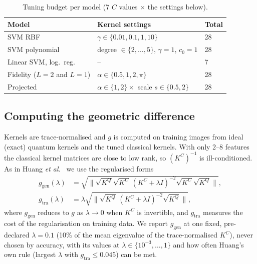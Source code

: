 \documentclass[conference]{IEEEtran}
\begin{document}
\begin{table}[t]
\centering
\caption{Tuning budget per model (7 $C$ values $\times$ the settings below).}
\label{tab:budget}
\footnotesize
\setlength{\tabcolsep}{4pt}
\begin{tabular}{@{}lll@{}}
\toprule
Model & Kernel settings & Total \\
\midrule
SVM RBF & $\gamma\in\{0.01,0.1,1,10\}$ & 28 \\
SVM polynomial & degree $\in\{2,\dots,5\}$, $\gamma=1$, $c_0=1$ & 28 \\
Linear SVM, log.\ reg. & -- & 7 \\
Fidelity ($L=2$ and $L=1$) & $\alpha\in\{0.5,1,2,\pi\}$ & 28 \\
Projected & $\alpha\in\{1,2\}\times$ scale $s\in\{0.5,2\}$ & 28 \\
\bottomrule
\end{tabular}
\end{table}

\subsection{Computing the geometric difference}
Kernels are trace-normalised and $g$ is computed on training images from ideal (exact) quantum kernels and the tuned classical kernels. With only 2--8 features the classical kernel matrices are close to low rank, so $(K^C)^{-1}$ is ill-conditioned. As in Huang \textit{et al.}~\cite[Supplementary Eqs.~F19--F20]{huang2021} we use the regularised forms
\begin{align}
g_{\mathrm{gen}}(\lambda) &= \sqrt{\big\|\sqrt{K^{Q}}\sqrt{K^{C}}\,(K^{C}+\lambda I)^{-2}\sqrt{K^{C}}\sqrt{K^{Q}}\big\|},\\
g_{\mathrm{tra}}(\lambda) &= \lambda\sqrt{\big\|\sqrt{K^{Q}}\,(K^{C}+\lambda I)^{-2}\sqrt{K^{Q}}\big\|},
\end{align}
where $g_{\mathrm{gen}}$ reduces to $g$ as $\lambda\to0$ when $K^C$ is invertible, and $g_{\mathrm{tra}}$ measures the cost of the regularisation on training data. We report $g_{\mathrm{gen}}$ at one fixed, pre-declared $\lambda=0.1$ (10\% of the mean eigenvalue of the trace-normalised $K^C$), never chosen by accuracy, with its values at $\lambda\in\{10^{-3},\dots,1\}$ and how often Huang's own rule (largest $\lambda$ with $g_{\mathrm{tra}}\le0.045$) can be met.
\end{document}
